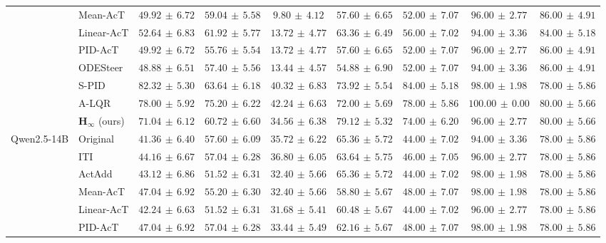 \begin{table}[!htbp]
{\begin{tabular}{llcccc|ccc}
 & Mean-AcT & $49.92\,\pm\,6.72$ & $59.04\,\pm\,5.58$ & $9.80\,\pm\,4.12$ & $57.60\,\pm\,6.65$ & $52.00\,\pm\,7.07$ & $96.00\,\pm\,2.77$ & $86.00\,\pm\,4.91$\\
 & Linear-AcT & $52.64\,\pm\,6.83$ & $61.92\,\pm\,5.77$ & $13.72\,\pm\,4.77$ & $63.36\,\pm\,6.49$ & $56.00\,\pm\,7.02$ & $94.00\,\pm\,3.36$ & $84.00\,\pm\,5.18$\\
 & PID-AcT & $49.92\,\pm\,6.72$ & $55.76\,\pm\,5.54$ & $13.72\,\pm\,4.77$ & $57.60\,\pm\,6.65$ & $52.00\,\pm\,7.07$ & $96.00\,\pm\,2.77$ & $86.00\,\pm\,4.91$\\
 & ODESteer & $48.88\,\pm\,6.51$ & $57.40\,\pm\,5.56$ & $13.44\,\pm\,4.57$ & $54.88\,\pm\,6.90$ & $52.00\,\pm\,7.07$ & $94.00\,\pm\,3.36$ & $86.00\,\pm\,4.91$\\
 & S-PID & $82.32\,\pm\,5.30$ & $63.64\,\pm\,6.18$ & $40.32\,\pm\,6.83$ & $73.92\,\pm\,5.54$ & $84.00\,\pm\,5.18$ & $98.00\,\pm\,1.98$ & $78.00\,\pm\,5.86$\\
 & A-LQR & $78.00\,\pm\,5.92$ & $75.20\,\pm\,6.22$ & $42.24\,\pm\,6.63$ & $72.00\,\pm\,5.69$ & $78.00\,\pm\,5.86$ & $100.00\,\pm\,0.00$ & $80.00\,\pm\,5.66$\\
 & $\boldsymbol{H_\infty}$ (ours) & $71.04\,\pm\,6.12$ & $60.72\,\pm\,6.60$ & $34.56\,\pm\,6.38$ & $79.12\,\pm\,5.32$ & $74.00\,\pm\,6.20$ & $96.00\,\pm\,2.77$ & $80.00\,\pm\,5.66$\\
\midrule
\multirow{10}{*}{Qwen2.5-14B} & Original & $41.36\,\pm\,6.40$ & $57.60\,\pm\,6.09$ & $35.72\,\pm\,6.22$ & $65.36\,\pm\,5.72$ & $44.00\,\pm\,7.02$ & $94.00\,\pm\,3.36$ & $78.00\,\pm\,5.86$\\
 & ITI & $44.16\,\pm\,6.67$ & $57.04\,\pm\,6.28$ & $36.80\,\pm\,6.05$ & $63.64\,\pm\,5.75$ & $46.00\,\pm\,7.05$ & $96.00\,\pm\,2.77$ & $78.00\,\pm\,5.86$\\
 & ActAdd & $43.12\,\pm\,6.86$ & $51.52\,\pm\,6.31$ & $32.40\,\pm\,5.66$ & $65.36\,\pm\,5.72$ & $44.00\,\pm\,7.02$ & $98.00\,\pm\,1.98$ & $78.00\,\pm\,5.86$\\
 & Mean-AcT & $47.04\,\pm\,6.92$ & $55.20\,\pm\,6.30$ & $32.40\,\pm\,5.66$ & $58.80\,\pm\,5.67$ & $48.00\,\pm\,7.07$ & $98.00\,\pm\,1.98$ & $78.00\,\pm\,5.86$\\
 & Linear-AcT & $42.24\,\pm\,6.63$ & $51.52\,\pm\,6.31$ & $31.68\,\pm\,5.41$ & $60.48\,\pm\,5.67$ & $44.00\,\pm\,7.02$ & $96.00\,\pm\,2.77$ & $78.00\,\pm\,5.86$\\
 & PID-AcT & $47.04\,\pm\,6.92$ & $57.04\,\pm\,6.28$ & $33.44\,\pm\,5.49$ & $62.16\,\pm\,5.67$ & $48.00\,\pm\,7.07$ & $98.00\,\pm\,1.98$ & $78.00\,\pm\,5.86$\\

\end{tabular}}
\end{table}
